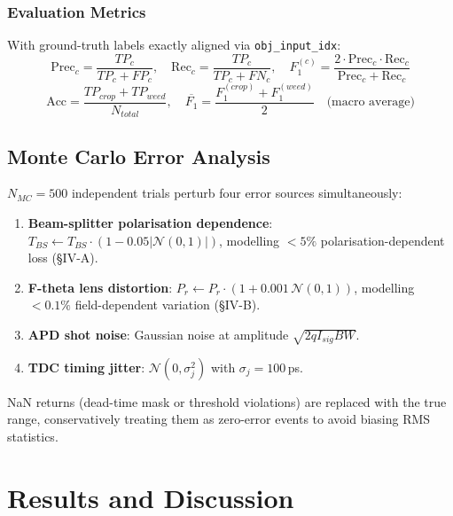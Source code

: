 \documentclass[12pt,a4paper]{article}
\begin{document}
\subsubsection{Evaluation Metrics}
With ground-truth labels exactly aligned via \texttt{obj\_input\_idx}:
\begin{equation}
    \mathrm{Prec}_c = \frac{TP_c}{TP_c+FP_c},\quad
    \mathrm{Rec}_c  = \frac{TP_c}{TP_c+FN_c},\quad
    F_1^{(c)} = \frac{2\cdot\mathrm{Prec}_c\cdot\mathrm{Rec}_c}
                     {\mathrm{Prec}_c+\mathrm{Rec}_c}
\end{equation}
\begin{equation}
    \mathrm{Acc} = \frac{TP_{crop}+TP_{weed}}{N_{total}},\quad
    \overline{F_1} = \frac{F_1^{(crop)}+F_1^{(weed)}}{2}\quad\text{(macro average)}
\end{equation}

\subsection{Monte Carlo Error Analysis}

$N_{MC} = 500$ independent trials perturb four error sources simultaneously:
\begin{enumerate}[label=(\roman*)]
    \item \textbf{Beam-splitter polarisation dependence}:
          $T_{BS} \leftarrow T_{BS}\cdot(1 - 0.05|\mathcal{N}(0,1)|)$,
          modelling $<5\%$ polarisation-dependent loss (\S IV-A).
    \item \textbf{F-theta lens distortion}:
          $P_r \leftarrow P_r\cdot(1 + 0.001\,\mathcal{N}(0,1))$,
          modelling $<0.1\%$ field-dependent variation (\S IV-B).
    \item \textbf{APD shot noise}: Gaussian noise at amplitude $\sqrt{2qI_{sig}BW}$.
    \item \textbf{TDC timing jitter}: $\mathcal{N}(0,\sigma_j^2)$ with $\sigma_j = 100$\,ps.
\end{enumerate}
NaN returns (dead-time mask or threshold violations) are replaced with the true range,
conservatively treating them as zero-error events to avoid biasing RMS statistics.

\section{Results and Discussion}
\label{sec:results}
\end{document}

